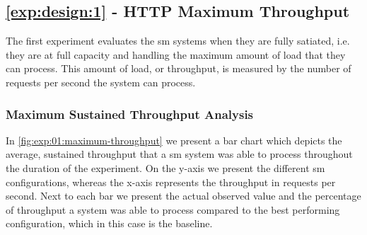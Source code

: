 \subsection{\ref{exp:design:1} - HTTP Maximum Throughput}
\label{sec:experiments:results:per-experiment:01}


The first experiment evaluates the \gls{sm} systems when they are fully satiated, i.e. they are at full capacity and handling the maximum amount of load that they can process. This amount of load, or throughput, is measured by the number of requests per second the system can process.


\subsubsection{Maximum Sustained Throughput Analysis}
\label{sec:experiments:results:per-experiment:01:throughput}

In \cref{fig:exp:01:maximum-throughput} we present a bar chart which depicts the average, sustained throughput that a \gls{sm} system was able to process throughout the duration of the experiment. On the y-axis we present the different \gls{sm} configurations, whereas the x-axis represents the throughput in requests per second. Next to each bar we present the actual observed value and the percentage of throughput a system was able to process compared to the  best performing configuration, which in this case is the baseline.


